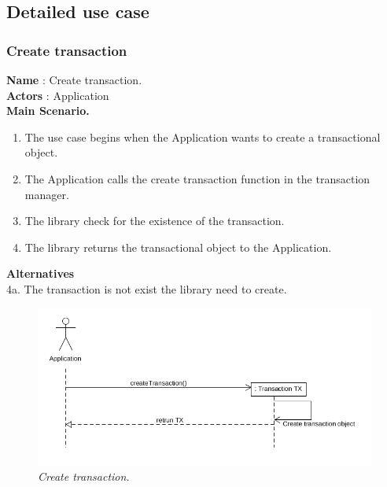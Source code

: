 \documentclass[12pt]{article}
\begin{document}
\subsection{Detailed use case}
{\setlength{\parindent}{0cm}
\subsubsection{Create transaction}
\textbf{Name} : Create transaction.\\
\textbf{Actors} : Application\\
\textbf{Main Scenario.}
\begin{enumerate}
  \item The use case begins when the Application wants to create a transactional object.
  \item The Application calls the create transaction function in the transaction manager.
  \item The library check for the existence of the transaction.
  \item The library returns the transactional object to the Application.
\end{enumerate}
\textbf{Alternatives}\\
4a. The transaction is not exist the library need to create.\\

\begin{figure}[h!]
\centering
\includegraphics[scale=0.5]{Pictures/create.png}
\caption{\textit{\color{gray}Create transaction.}}
\end{figure}

}
\end{document}
